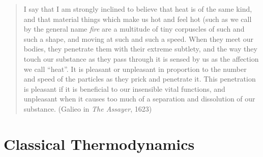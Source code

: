 \small
\begin{quote}I say that I am strongly inclined to believe that heat is of 
the same kind, and that material things which make us hot and feel hot 
(such as we call by the general name \emph{fire} are a multitude of tiny 
corpuscles of such and such a shape, and moving at such and such a speed. 
When they meet our bodies, they penetrate them with their extreme subtlety, 
and the way they touch our substance as they pass through it is sensed by 
us as the affection we call ``heat''. 
It is pleasant or unpleasant in 
proportion to the number and speed of the particles as they prick and 
penetrate it. This penetration is pleasant if it is beneficial to our 
insensible vital functions, and unpleasant when it causes too much of a 
separation and dissolution of our substance. (Galieo in \emph{The Assayer}, 
1623)
\end{quote}
\normalsize




\fi  %

\iffalse  %
\chapter{Classical Thermodynamics}
\label{chapter:dice}

\small



